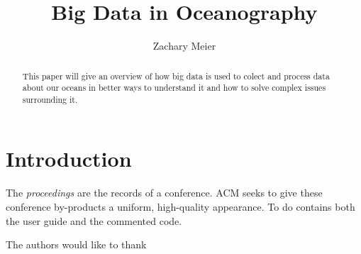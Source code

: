 \documentclass[sigconf]{acmart}
\begin{document}
\title{Big Data in Oceanography}


\author{Zachary Meier}

\renewcommand{\shortauthors}{B. Trovato et al.}


\begin{abstract}
This paper will give an overview of how big data is used to colect and process data about our oceans in better ways to understand it and how to solve complex issues surrounding it. 

\end{abstract}



\maketitle

\section{Introduction}

The \textit{proceedings} are the records of a
conference. ACM seeks to give these
conference by-products a uniform, high-quality appearance.  To do
 contains both the user guide and the commented code.

\begin{acks}

  The authors would like to thank \cite{editor00}

\end{acks}


 
\end{document}
